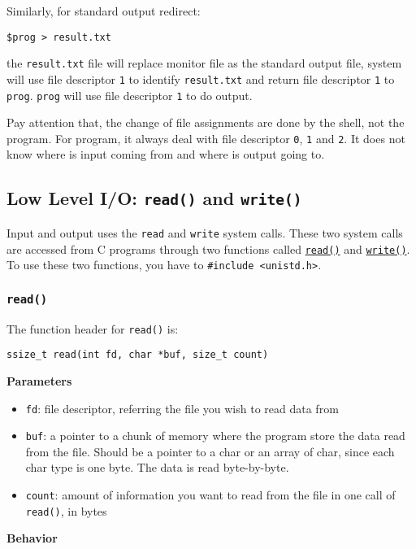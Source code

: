 \documentclass[12pt]{article}
\begin{document}
Similarly, for standard output redirect:
\begin{verbatim}
$prog > result.txt
\end{verbatim}
the \texttt{result.txt} file will replace monitor file as the standard output file, system will use file descriptor \texttt{1} to identify \texttt{result.txt} and return file descriptor \texttt{1} to \texttt{prog}. \texttt{prog} will use file descriptor \texttt{1} to do output.

Pay attention that, the change of file assignments are done by the shell, not the program. For program, it always deal with file descriptor \texttt{0}, \texttt{1} and \texttt{2}. It does not know where is input coming from and where is output going to.
\subsection{Low Level I/O: \texttt{read()} and \texttt{write()}}
\label{sec:orgff80d5e}
Input and output uses the \texttt{read} and \texttt{write} system calls. These two system calls are accessed from C programs through two functions called \href{http://man7.org/linux/man-pages/man2/read.2.html}{\texttt{read()}} and \href{http://man7.org/linux/man-pages/man2/write.2.html}{\texttt{write()}}. To use these two functions, you have to \texttt{\#include <unistd.h>}.
\subsubsection{\texttt{read()}}
\label{sec:org167a055}
The function header for \texttt{read()} is:
\begin{verbatim}
ssize_t read(int fd, char *buf, size_t count)
\end{verbatim}
\textbf{Parameters}

\begin{itemize}
\item \texttt{fd}: file descriptor, referring the file you wish to read data from
\item \texttt{buf}: a pointer to a chunk of memory where the program store the data read from the file. Should be a pointer to a char or an array of char, since each char type is one byte. The data is read byte-by-byte.
\item \texttt{count}: amount of information you want to read from the file in one call of \texttt{read()}, in bytes
\end{itemize}

\textbf{Behavior}
\end{document}
